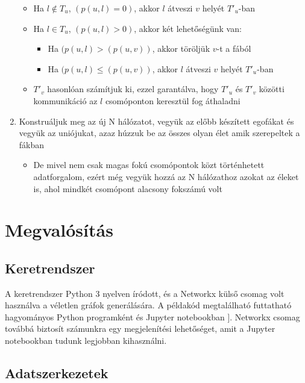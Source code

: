 \documentclass[12pt]{report}
\begin{document}
\begin{enumerate}
	\begin{itemize}
		\item Ha \(l \notin T_u\), \((p(u, l) = 0)\), akkor \(l\) átveszi \(v\) helyét \(T'_u\)-ban
		\item Ha \(l \in T_u\), \((p(u, l) > 0)\), akkor két lehetőségünk van:
		\begin{itemize}
			\item Ha \((p(u, l) > (p(u, v))\), akkor töröljük \(v\)-t a fából
			\item Ha \((p(u, l) \le (p(u, v))\), akkor \(l\) átveszi \(v\) helyét \(T'_u\)-ban
		\end{itemize}
		\item \(T'_v\) hasonlóan számítjuk ki, ezzel garantálva, hogy \(T'_u\) és \(T'_v\) közötti kommunikáció az \(l\) csomóponton keresztül fog áthaladni
	\end{itemize}
	\item Konstruáljuk meg az új N hálózatot, vegyük az előbb készített egofákat és vegyük az uniójukat, azaz húzzuk be az összes olyan élet amik szerepeltek a fákban
	\begin{itemize}
		\item     De mivel nem csak magas fokú csomópontok közt történhetett adatforgalom, ezért még vegyük hozzá az N hálózathoz azokat az éleket is, ahol mindkét csomópont alacsony fokszámú volt
	\end{itemize}
\end{enumerate}

\chapter{Megvalósítás}

\section{Keretrendszer}

A keretrendszer Python 3 nyelven íródott, és a Networkx külső csomag volt használva a véletlen gráfok generálására.
A példakód megtalálható futtatható hagyományos Python programként és Jupyter notebookban \cite{noauthor_jupyter_nodate}].  
Networkx csomag továbbá biztosít számunkra egy megjelenítési lehetőséget, amit a Jupyter notebookban tudunk legjobban kihasználni.



\section{Adatszerkezetek}
\end{document}
